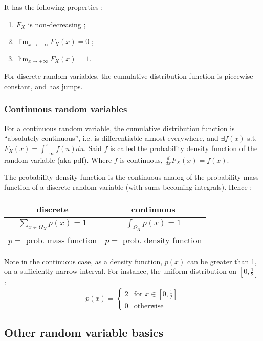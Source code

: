 \documentclass[12pt]{report}
\newcommand{\defobj}[1]{\color{red}#1\color{black}{}}
\newcommand{\defmean}[1]{\color{green!70!black}#1\color{black}{}}
\renewcommand{\emph}[1]{\color{violet}#1\color{black}{}}
\begin{document}
\noindent It has the following properties :

\begin{enumerate}
\item $F_X$ is non-decreasing ;
\item $\displaystyle\lim_{x \rightarrow -\infty} F_X(x) = 0$ ;
\item $\displaystyle\lim_{x \rightarrow +\infty} F_X(x) = 1$.
\end{enumerate}
For discrete random variables, the cumulative distribution function is piecewise constant, and has jumps.

\subsubsection{Continuous random variables}

For a \defobj{continuous random variable}, \defmean{the cumulative distribution
  function  is ``absolutely continuous''}, i.e. \defmean{is differentiable almost everywhere,
and $\exists f(x)$ s.t. $F_X(x) = \int_{-\infty}^{x} f(u) du$}. %
Said $f$ is called the \defobj{probability density function} of the random variable (aka \emph{pdf}). Where $f$ is continuous, $\frac{d}{dx}F_X(x) = f(x)$.

The probability density function is the continuous analog of the probability
mass function of a discrete random variable (with sums becoming integrals). Hence :

\begin{center}
\begin{tabular}{cc}
discrete & continuous \\\hline
$\displaystyle\sum_{x\in\Omega_X} p(x) = 1$ & $\displaystyle\int_{\Omega_X} p(x) = 1$\\
$p =$ prob. \emph{mass} function & $p =$ prob. \emph{density} function
\end{tabular}
\end{center}

Note in the continuous case, as a density function, $p(x)$ can be greater than 1, on a sufficiently narrow interval. For instance, the uniform distribution on $[0,\frac{1}{2}]$ :
\[p(x) = \left\{\begin{array}{ll}
2 & \text{for } x \in [0,\frac{1}{2}]\\
0 & \text{otherwise}
\end{array}\right.\]

\subsection{Other random variable basics}
\end{document}
